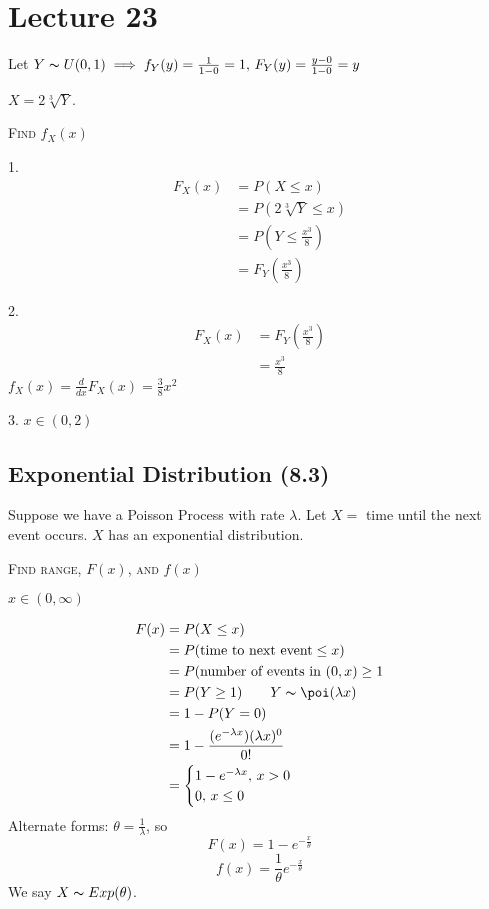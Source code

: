 \section{Lecture 23}

Let $ Y \thicksim U(0,1)\implies f_Y(y)=\frac{1}{1-0}=1,\,
F_Y(y)=\frac{y-0}{1-0}=y $

$ X=2\sqrt[3]{Y} $.

\textsc{Find $ f_X(x) $}

1.
\begin{align*}
    F_X(x)&=P(X\le x)\\
    &=P\left(2\sqrt[3]{Y}\le x\right)\\
    &=P\left(Y\le \frac{x^3}{8}\right)\\
    &=F_Y\left(\frac{x^3}{8} \right)
\end{align*}

2.
\begin{align*}
    F_X(x)&=F_Y\left(\frac{x^3}{8} \right)\\
    &=\frac{x^3}{8}
\end{align*}
$ f_X(x)=\frac{d}{dx}F_X(x)=\frac{3}{8}x^2 $

3. $ x\in(0,2) $

\subsection{Exponential Distribution (8.3)}
Suppose we have a Poisson Process with rate $ \lambda $. Let
$ X= $ time until the next event occurs. $ X $ has an exponential distribution.

\textsc{Find range, $ F(x) $, and $ f(x) $}

$ x\in(0,\infty) $

\begin{align*}
    F(x)&=P(X\le x)\\
    &=P(\text{time to next event}\le x)\\
    &=P(\text{number of events in } (0,x)\ge 1\\
    &=P(Y\ge 1)\qquad Y \thicksim \poi(\lambda x)\\
    &=1-P(Y=0)\\
    &=1-\frac{(e^{-\lambda x})(\lambda x)^0}{0!}\\
    &=
    \begin{cases}
        1-e^{-\lambda x},\, x>0\\
        0,\, x\le 0
    \end{cases}
\end{align*}
Alternate forms: $ \theta=\frac{1}{\lambda} $, so
\[ F(x)=1-e^{-\frac{x}{\theta}} \]
\[ f(x)=\frac{1}{\theta}e^{-\frac{x}{\theta}} \]
We say $ X \thicksim Exp(\theta) $.
